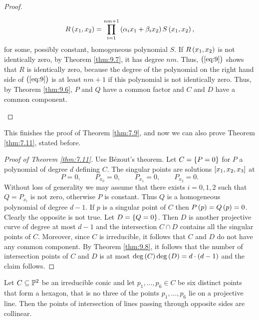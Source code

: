 \begin{proof}
\begin{enumerate}
\begin{equation}
\label{eq:9}
R\br{x_1, x_2} = \prod_{i = 1}^{nm + 1} \br{\alpha_ix_1 + \beta_ix_2}S\br{x_1, x_2},
\end{equation}
for some, possibly constant, homogeneous polynomial $ S $. If $ R\br{x_1, x_2} $ is not identically zero, by Theorem \ref{thm:9.7}, it has degree $ nm $. Thus, $ \br{\ref{eq:9}} $ shows that $ R $ is identically zero, because the degree of the polynomial on the right hand side of $ \br{\ref{eq:9}} $ is at least $ nm + 1 $ if this polynomial is not identically zero. Thus, by Theorem \ref{thm:9.6}, $ P $ and $ Q $ have a common factor and $ C $ and $ D $ have a common component.
\end{enumerate}
\end{proof}

This finishes the proof of Theorem \ref{thm:7.9}, and now we can also prove Theorem \ref{thm:7.11}, stated before.

\pagebreak

\begin{proof}[Proof of Theorem \ref{thm:7.11}]
Use B\'ezout's theorem. Let $ C = \cbr{P = 0} $ for $ P $ a polynomial of degree $ d $ defining $ C $. The singular points are solutions $ \sbr{x_1, x_2, x_3} $ at
$$ P = 0, \qquad P_{x_0} = 0, \qquad P_{x_1} = 0, \qquad P_{x_2} = 0. $$
Without loss of generality we may assume that there exists $ i = 0, 1, 2 $ such that $ Q = P_{x_i} $ is not zero, otherwise $ P $ is constant. Thus $ Q $ is a homogeneous polynomial of degree $ d - 1 $. If $ p $ is a singular point of $ C $ then $ P\br{p} = Q\br{p} = 0 $. Clearly the opposite is not true. Let $ D = \cbr{Q = 0} $. Then $ D $ is another projective curve of degree at most $ d - 1 $ and the intersection $ C \cap D $ contains all the singular points of $ C $. Moreover, since $ C $ is irreducible, it follows that $ C $ and $ D $ do not have any common component. By Theorem \ref{thm:9.8}, it follows that the number of intersection points of $ C $ and $ D $ is at most $ \deg\br{C}\deg\br{D} = d \cdot \br{d - 1} $ and the claim follows.
\end{proof}

\begin{proposition}
Let $ C \subseteq \P^2 $ be an irreducible conic and let $ p_1, \dots, p_6 \in C $ be six distinct points that form a hexagon, that is no three of the points $ p_1, \dots, p_6 $ lie on a projective line. Then the points of intersection of lines passing through opposite sides are collinear.
\end{proposition}

